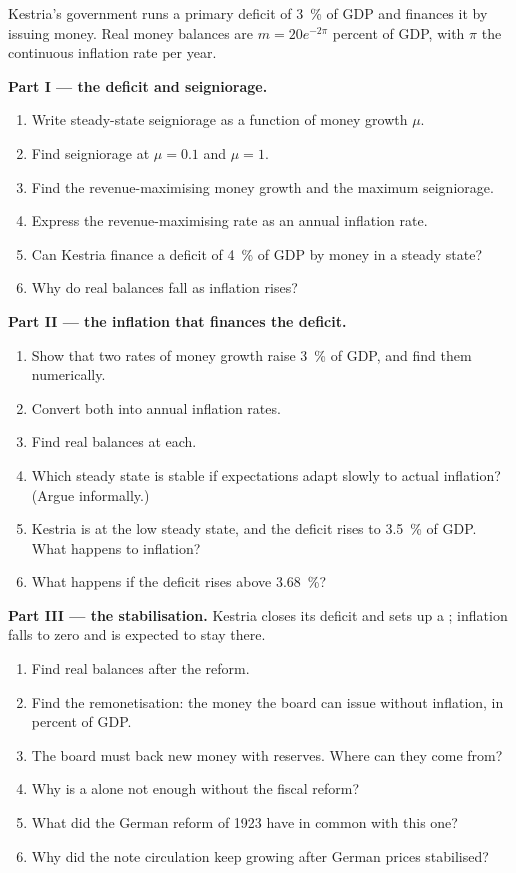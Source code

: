 \begin{problem}\label{pb:b3:inflation-evidence:kestria}
Kestria's government runs a primary deficit of 3~\% of GDP and finances it by issuing
money. Real money balances are $m = 20e^{-2\pi}$ percent of GDP, with $\pi$ the continuous
inflation rate per year. %

\medskip\noindent\textbf{Part I --- the deficit and seigniorage.}
\begin{enumerate}
\item Write steady-state seigniorage as a function of money growth $\mu$.
\item Find seigniorage at $\mu = 0.1$ and $\mu = 1$.
\item Find the revenue-maximising money growth and the maximum seigniorage.
\item Express the revenue-maximising rate as an annual inflation rate.
\item Can Kestria finance a deficit of 4~\% of GDP by money in a steady state?
\item Why do real balances fall as inflation rises?
\end{enumerate}

\medskip\noindent\textbf{Part II --- the inflation that finances the deficit.}
\begin{enumerate}[resume]
\item Show that two rates of money growth raise 3~\% of GDP, and find them numerically.
\item Convert both into annual inflation rates.
\item Find real balances at each.
\item Which steady state is stable if expectations adapt slowly to actual
inflation? (Argue informally.)
\item Kestria is at the low steady state, and the deficit rises to 3.5~\% of GDP. What
happens to inflation?
\item What happens if the deficit rises above 3.68~\%?
\end{enumerate}

\medskip\noindent\textbf{Part III --- the stabilisation.} Kestria closes its deficit
and sets up a ; inflation falls to zero and is expected to stay
there.
\begin{enumerate}[resume]
\item Find real balances after the reform.
\item Find the remonetisation: the money the board can issue without inflation, in
percent of GDP.
\item The board must back new money with reserves. Where can they come from?
\item Why is a  alone not enough without the fiscal reform?
\item What did the German reform of 1923 have in common with this one?
\item Why did the note circulation keep growing after German prices stabilised?
\end{enumerate}


\end{problem}
